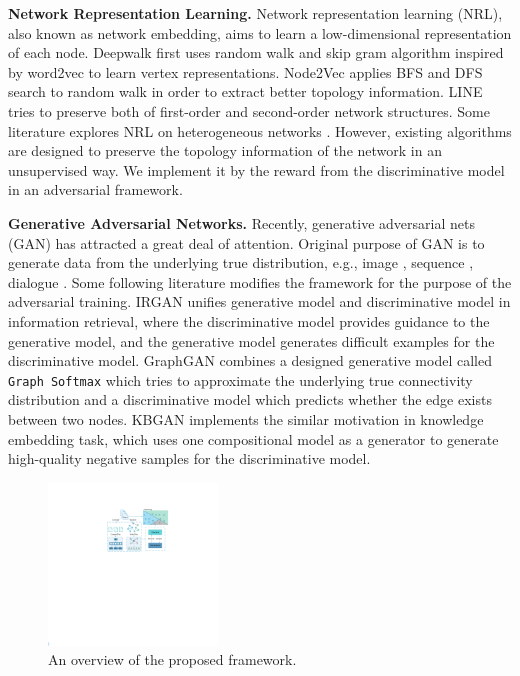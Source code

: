 \documentclass[letterpaper]{article} %
\begin{document}
\noindent \textbf{Network Representation Learning.}
Network representation learning (NRL), also known as network embedding, aims to learn a low-dimensional representation of each node.
Deepwalk \cite{DeepWalk} first uses random walk and skip gram algorithm inspired by word2vec \cite{word2vec1,wor2vec2} to learn vertex representations.
Node2Vec \cite{Node2vec} applies BFS and DFS search to random walk in order to extract better topology information.
LINE \cite{LINE} tries to preserve both of first-order and second-order network structures.
Some literature explores NRL on heterogeneous networks \cite{PTE,Metapath2Vec}.
However, existing algorithms are designed to preserve the topology information of the network in an unsupervised way. 
We implement it by the reward from the discriminative model in an adversarial framework.

\noindent \textbf{Generative Adversarial Networks.}
Recently, generative adversarial nets (GAN) \cite{GAN} has attracted a great deal of attention. Original purpose of GAN is to generate data from the underlying true distribution, e.g., image \cite{image}, sequence \cite{seq}, dialogue \cite{Dialogue}. Some following literature modifies the framework for the purpose of the adversarial training.
IRGAN \cite{IRGAN} unifies generative model and discriminative model in information retrieval, where the discriminative model provides guidance to the generative model, 
and the generative model generates difficult examples for the discriminative model.
GraphGAN \cite{GraphGAN} combines a designed generative model called \texttt{Graph Softmax} which tries to approximate the
underlying true connectivity distribution and a discriminative model which predicts whether the edge exists between two nodes.
KBGAN \cite{KBGAN} implements the similar motivation in knowledge embedding task, which uses one compositional model as a generator to generate high-quality negative samples for the discriminative model.

\begin{figure}[t]
\centering
\includegraphics[width=0.4\textwidth]{framework.pdf}
\caption{An overview of the proposed framework.}
\label{fig:framework}
\end{figure}
\end{document}
